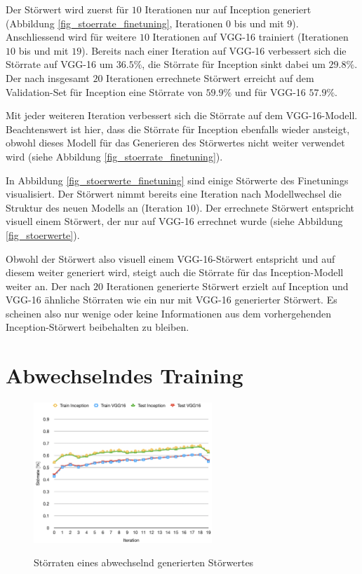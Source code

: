 \documentclass{FFHS_Thesis_Additions/ffhsthesis}
\begin{document}
Der Störwert wird zuerst für $10$ Iterationen nur auf Inception generiert (Abbildung \ref{fig_stoerrate_finetuning}, Iterationen $0$ bis und mit $9$).  
Anschliessend wird für weitere $10$ Iterationen auf VGG-16 trainiert (Iterationen $10$ bis und mit $19$). 
Bereits nach einer Iteration auf VGG-16 verbessert sich die Störrate auf VGG-16 um $36.5\%$, die Störrate für Inception sinkt dabei um $29.8\%$. 
Der nach insgesamt $20$ Iterationen errechnete Störwert erreicht auf dem Validation-Set für Inception eine Störrate von $59.9\%$ und für VGG-16 $57.9\%$.

Mit jeder weiteren Iteration verbessert sich die Störrate auf dem VGG-16-Modell. 
Beachtenswert ist hier, dass die Störrate für Inception ebenfalls wieder ansteigt, obwohl dieses Modell für das Generieren des Störwertes nicht weiter verwendet wird (siehe Abbildung \ref{fig_stoerrate_finetuning}). 

In Abbildung \ref{fig_stoerwerte_finetuning} sind einige Störwerte des Finetunings visualisiert. 
Der Störwert nimmt bereits eine Iteration nach Modellwechsel die Struktur des neuen Modells an (Iteration $10$).
Der errechnete Störwert entspricht visuell einem Störwert, der nur auf VGG-16 errechnet wurde (siehe Abbildung \ref{fig_stoerwerte}).

Obwohl der Störwert also visuell einem VGG-16-Störwert entspricht und auf diesem weiter generiert wird, steigt auch die Störrate für das Inception-Modell weiter an. Der nach $20$ Iterationen generierte Störwert erzielt auf Inception und VGG-16 ähnliche Störraten wie ein nur mit VGG-16 generierter Störwert. Es scheinen also nur wenige oder keine Informationen aus dem vorhergehenden Inception-Störwert beibehalten zu bleiben.

\section{Abwechselndes Training}

\begin{figure}[h]
\caption{Störraten eines abwechselnd generierten Störwertes}
\centering
\includegraphics[width=0.6\textwidth]{./images/stoerrate_alternate.png}
\label{fig_stoerrate_alternate}
\end{figure}
\end{document}
